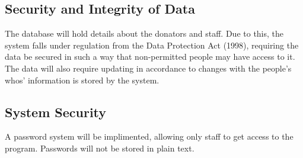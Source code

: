 \subsection{Security and Integrity of Data}
The database will hold details about the donators and staff. Due to this, the system falls under regulation from the Data Protection Act (1998), requiring the data be secured in such a way that non-permitted people may have access to it. The data will also require updating in accordance to changes with the people's whos' information is stored by the system.

\subsection{System Security}
A password system will be implimented, allowing only staff to get access to the program. Passwords will not be stored in plain text.